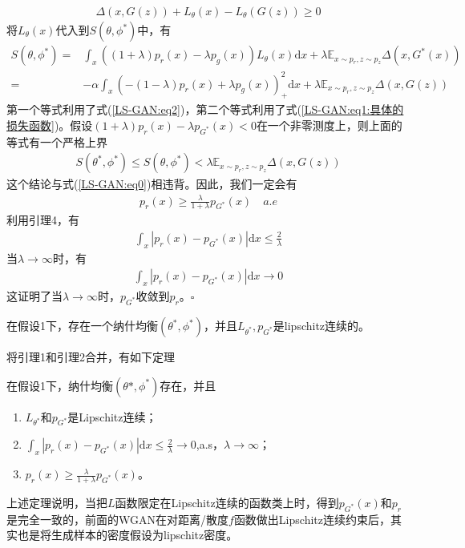 \begin{Proof}
\begin{align}
            \label{LS-GAN:eq2}
            \Delta(x,G(z)) + L_\theta(x) - L_\theta(G(z)) \geqslant 0
            \end{align}
            将$L_\theta(x)$代入到$S(\theta,\phi^*)$中，有
            \begin{align*}
            S(\theta,\phi^*) =& \int_x((1+\lambda)p_r(x) - \lambda p_g(x))L_\theta(x)\mathrm{d}x + \lambda \mathbb{E}_{x\sim p_r,z\sim p_z} \Delta(x,G^*(x))\\
            =& -\alpha\int_x(-(1-\lambda)p_r(x)+\lambda p_g(x))_+^2\mathrm{d}x +\lambda \mathbb{E}_{x\sim p_r,z\sim p_z}\Delta (x,G(z))
            \end{align*}
            第一个等式利用了式(\ref{LS-GAN:eq2})，第二个等式利用了式(\ref{LS-GAN:eq1:具体的损失函数})。假设$(1+\lambda)p_r(x) - \lambda p_{G^*}(x) < 0$在一个非零测度上，则上面的等式有一个严格上界
            \begin{align*}
            S(\theta^*,\phi^*) \leqslant S(\theta,\phi^*) < \lambda \mathbb{E}_{x\sim p_r,z\sim p_z}\Delta(x,G(z))
            \end{align*}
            这个结论与式(\ref{LS-GAN:eq0})相违背。因此，我们一定会有
            \begin{align*}
            p_r(x) \geqslant \frac{\lambda}{1+\lambda}p_{G^*}(x) \quad a.e
            \end{align*}
            利用引理4，有
            \begin{align*}
            \int_x|p_r(x) - p_{G^*}(x)|\mathrm{d}x \leqslant \frac{2}{\lambda}
            \end{align*}
            当$\lambda \to \infty$时，有
            \begin{align*}
            \int_x |p_r(x) - p_{G^*}(x)| \mathrm{d}x \to 0
            \end{align*}
            这证明了当$\lambda\to \infty$时，$p_{G^*}$收敛到$p_r$。$\square$
            \end{Proof}
            \begin{lemma}[2]
            在假设1下，存在一个纳什均衡$(\theta^*,\phi^*)$，并且$L_{\theta^*},p_{G^*}$是lipschitz连续的。
            \end{lemma}
            \par
            将引理1和引理2合并，有如下定理
            \begin{theorem}[Theorem 1]
            在假设1下，纳什均衡$(\theta*,\phi^*)$存在，并且
            \begin{enumerate}
            \item $L_{\theta^*}$和$p_{G^*}$是Lipschitz连续；
            \item $\int_x |p_r(x) - p_{G^*}(x)|\mathrm{d}x \leqslant \frac{2}{\lambda}\to 0$,a.s，$\lambda\to \infty$；
            \item $p_r(x) \geqslant \frac{\lambda}{1+\lambda} p_{G^*}(x)$。
            \end{enumerate}
            \end{theorem}
            \par
            上述定理说明，当把$L$函数限定在Lipschitz连续的函数类上时，得到$p_{G^*}(x)$和$p_r$是完全一致的，前面的WGAN在对距离/散度$f$函数做出Lipschitz连续约束后，其实也是将生成样本的密度假设为lipschitz密度。
